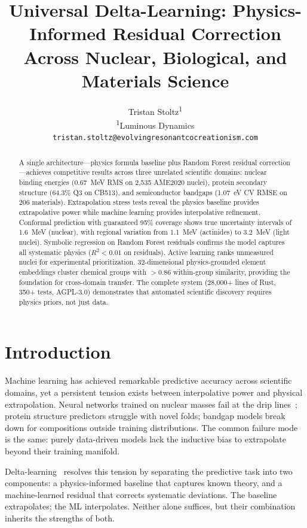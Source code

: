 \documentclass[twocolumn,letterpaper,10pt]{article}
\title{Universal Delta-Learning: Physics-Informed Residual Correction\\Across Nuclear, Biological, and Materials Science}
\author{
  Tristan Stoltz\textsuperscript{1}
  \\[4pt]
  \textsuperscript{1}Luminous Dynamics\\
  \texttt{tristan.stoltz@evolvingresonantcocreationism.com}
}
\date{}
\begin{document}
\maketitle

\begin{abstract}
A single architecture---physics formula baseline plus Random Forest residual
correction---achieves competitive results across three unrelated scientific
domains: nuclear binding energies (0.67~MeV RMS on 2,535 AME2020 nuclei),
protein secondary structure (64.3\% Q3 on CB513), and semiconductor bandgaps
(1.07~eV CV RMSE on 206 materials). Extrapolation stress tests reveal the
physics baseline provides extrapolative power while machine learning provides
interpolative refinement. Conformal prediction with guaranteed 95\% coverage
shows true uncertainty intervals of 1.6~MeV (nuclear), with regional variation
from 1.1~MeV (actinides) to 3.2~MeV (light nuclei). Symbolic regression on
Random Forest residuals confirms the model captures all systematic physics
($R^2 < 0.01$ on residuals). Active learning ranks unmeasured nuclei for
experimental prioritization. 32-dimensional physics-grounded element embeddings
cluster chemical groups with $>0.86$ within-group similarity, providing the
foundation for cross-domain transfer. The complete system (28,000+ lines of
Rust, 350+ tests, AGPL-3.0) demonstrates that automated scientific discovery
requires physics priors, not just data.
\end{abstract}

\section{Introduction}
\label{sec:introduction}

Machine learning has achieved remarkable predictive accuracy across scientific
domains, yet a persistent tension exists between interpolative power and
physical extrapolation. Neural networks trained on nuclear masses fail at the
drip lines~\citep{ame2020}; protein structure predictors struggle with novel
folds; bandgap models break down for compositions outside training
distributions. The common failure mode is the same: purely data-driven models
lack the inductive bias to extrapolate beyond their training manifold.

Delta-learning~\citep{ramakrishnan2015} resolves this tension by separating
the predictive task into two components: a physics-informed baseline that
captures known theory, and a machine-learned residual that corrects systematic
deviations. The baseline extrapolates; the ML interpolates. Neither alone
suffices, but their combination inherits the strengths of both.
\end{document}
